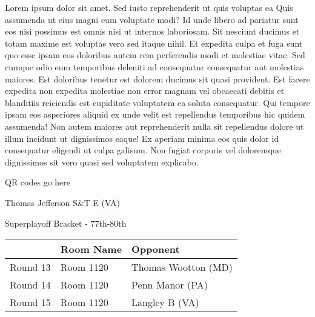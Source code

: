 \documentclass{article}%
\begin{document}
\vspace*{8pt}%
\linebreak%
\newline%
\newline%
Lorem ipsum dolor sit amet. Sed iusto reprehenderit ut quis voluptas ea Quis assumenda ut eius magni eum voluptate modi? Id unde libero ad pariatur sunt eos nisi possimus est omnis nisi ut internos laboriosam. Sit nesciunt ducimus et totam maxime est voluptas vero sed itaque nihil. Et expedita culpa et fuga sunt quo esse ipsam eos doloribus autem rem perferendis modi et molestiae vitae.\newline%
\newline%
Sed cumque odio eum temporibus deleniti ad consequatur consequatur aut molestias maiores. Est doloribus tenetur est dolorem ducimus sit quasi provident. Est facere expedita non expedita molestiae non error magnam vel obcaecati debitis et blanditiis reiciendis est cupiditate voluptatem ea soluta consequatur. Qui tempore ipsam eos asperiores aliquid ex unde velit est repellendus temporibus hic quidem assumenda!\newline%
\newline%
Non autem maiores aut reprehenderit nulla sit repellendus dolore ut illum incidunt ut dignissimos eaque! Ex aperiam minima eos quis dolor id consequatur eligendi ut culpa galisum. Non fugiat corporis vel doloremque dignissimos sit vero quasi sed voluptatem explicabo.\newline%
\newline%
%
\vspace*{30pt}%
\begin{center}%
\begin{Huge}%
QR codes go here%
\end{Huge}%
\end{center}%
\newpage%
\begin{center}%
\begin{Huge}%
Thomas Jefferson S\&T E (VA)%
\end{Huge}%
\vspace*{8pt}%
\linebreak%
\begin{Large}%
Superplayoff Bracket {-} 77th{-}80th%
\end{Large}%
\end{center}%
%
\begin{tabularx}{\textwidth}{|c|Y|Y|}%
\hline%
&Room Name&Opponent\\%
\hline%
Round 13&Room 1120&Thomas Wootton (MD)\\%
Round 14&Room 1120&Penn Manor (PA)\\%
Round 15&Room 1120&Langley B (VA)\\%
\hline%
\end{tabularx}%
\end{document}
